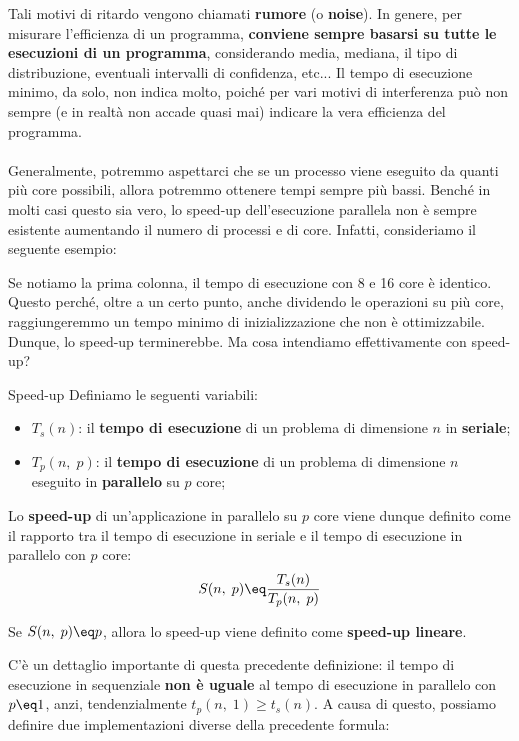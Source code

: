 Tali motivi di ritardo vengono chiamati \textbf{rumore} (o \textbf{noise}). In genere, per misurare l'efficienza di un programma, \textbf{conviene sempre basarsi su tutte le esecuzioni di un programma}, considerando media, mediana, il tipo di distribuzione, eventuali intervalli di confidenza, etc... Il tempo di esecuzione minimo, da solo, non indica molto, poiché per vari motivi di interferenza può non sempre (e in realtà non accade quasi mai) indicare la vera efficienza del programma.
\\\\
Generalmente, potremmo aspettarci che se un processo viene eseguito da quanti più core possibili, allora potremmo ottenere tempi sempre più bassi. Benché in molti casi questo sia vero, lo speed-up dell'esecuzione parallela non è sempre esistente aumentando il numero di processi e di core. Infatti, consideriamo il seguente esempio:


Se notiamo la prima colonna, il tempo di esecuzione con 8 e 16 core è identico. Questo perché, oltre a un certo punto, anche dividendo le operazioni su più core, raggiungeremmo un tempo minimo di inizializzazione che non è ottimizzabile. Dunque, lo speed-up terminerebbe. Ma cosa intendiamo effettivamente con speed-up?

\begin{definition}{Speed-up}
    Definiamo le seguenti variabili:
    \begin{itemize}
        \item $T_s(n)$: il \textbf{tempo di esecuzione} di un problema di dimensione $n$ in \textbf{seriale};
        \item $T_p(n, \; p)$: il \textbf{tempo di esecuzione} di un problema di dimensione $n$ eseguito in \textbf{parallelo} su $p$ core;
    \end{itemize}

    Lo \textbf{speed-up} di un'applicazione in parallelo su $p$ core viene dunque definito come il rapporto tra il tempo di esecuzione in seriale e il tempo di esecuzione in parallelo con $p$ core:
    \[ S(n, \; p) \eq \frac{T_s(n)}{T_p(n, \; p)} \]

    Se $S(n, \; p) \eq p$, allora lo speed-up viene definito come \textbf{speed-up lineare}.
\end{definition}

C'è un dettaglio importante di questa precedente definizione: il tempo di esecuzione in sequenziale \textbf{non è uguale} al tempo di esecuzione in parallelo con $p \eq 1$, anzi, tendenzialmente $t_p(n, \; 1) \geq t_s(n)$. A causa di questo, possiamo definire due implementazioni diverse della precedente formula:

